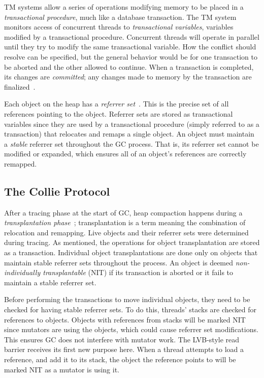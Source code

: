 \documentclass{sig-alternate}
\begin{document}
TM systems allow a series
of operations modifying memory to be placed in
a \emph{transactional procedure}, much like a database transaction.
The TM system monitors access of concurrent threads to \emph{transactional variables},
variables modified by a transactional procedure.
Concurrent threads will operate in parallel until they try to modify
the same transactional variable. How 
the conflict should resolve can be specified, but the general behavior would be for one transaction
to be aborted and the other allowed to continue.
When a transaction is completed, its changes are \emph{committed}; any changes 
made to memory by the transaction are finalized~\cite{wiki:transactional-memory}.

Each object on the heap has a \emph{referrer set}~\cite{Iyengar:Collie}. This is the precise set 
of all references pointing to the object. 
Referrer sets are stored as transactional variables since they are used by a transactional procedure 
(simply referred to as a transaction)
that relocates and remaps a single object.
An object must maintain a \emph{stable} referrer set throughout the GC process. That is,
its referrer set cannot be modified or expanded, which
ensures all of an object's references
are correctly remapped.



\subsection{The Collie Protocol}
\label{sec:collieProtocol}

After a tracing phase at the start of GC, heap compaction
happens during a \emph{transplantation phase}~\cite{Iyengar:Collie};
transplantation is a term meaning the combination of relocation and remapping.
Live objects and their referrer sets were determined during tracing. As mentioned, 
the operations for object transplantation are stored as a
transaction. Individual object transplantations are done only on objects 
that maintain stable referrer sets throughout the process.
An object is deemed \emph{non-individually transplantable} (NIT) if its transaction
is aborted or it fails to maintain a stable referrer set. 

Before performing the transactions to move individual objects, they
need to be checked for having stable referrer sets. To do this, threads' stacks
are checked for references to objects. Objects with references from stacks
will be marked NIT since mutators are using the objects, which could cause referrer set modifications.
This ensures GC does not interfere with mutator work.
The LVB-style read barrier receives its first new purpose here. When a thread attempts to load a reference,
and add it to its stack, the object the reference points to will be marked NIT as a mutator is using it.
\end{document}
